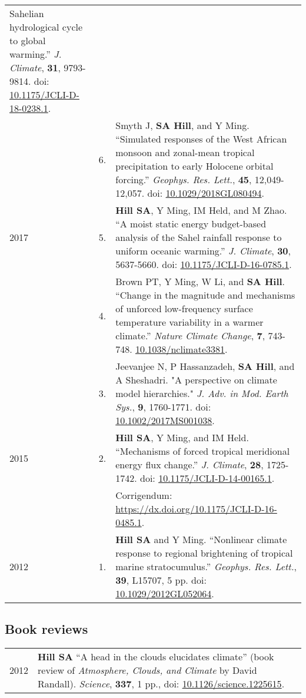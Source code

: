 \documentclass[letterpaper,11pt]{shillcv}
\begin{document}
\begin{longtable}{@{} Y{0.05\textwidth} >{\color{black}} p{0.04\textwidth} @{} L{0.91\textwidth} @{}}
Sahelian hydrological cycle to global warming.''  \emph{J. Climate}, \textbf{31}, 9793-9814.  doi: \href{https://doi.org/10.1175/JCLI-D-18-0238.1}{10.1175/JCLI-D-18-0238.1}.\\
     & 6. & Smyth J, \textbf{SA Hill}, and Y Ming.  ``Simulated responses of
the West African monsoon and zonal-mean tropical precipitation to early
Holocene orbital forcing.''  \emph{Geophys. Res. Lett.}, \textbf{45},
12,049-12,057.  doi: \href{https://doi.org/10.1029/2018GL080494}{10.1029/2018GL080494}.\\
2017 & 5. & \textbf{Hill SA}, Y Ming, IM Held, and M Zhao.  ``A moist
static energy budget-based analysis of the Sahel rainfall response to uniform
oceanic warming.''  \emph{J. Climate}, \textbf{30}, 5637-5660.  doi: \href{https://doi.org/10.1175/JCLI-D-16-0785.1}{10.1175/JCLI-D-16-0785.1}.\\
     & 4. & Brown PT, Y Ming, W Li, and \textbf{SA Hill}.  ``Change
in the magnitude and mechanisms of unforced low-frequency surface temperature
variability in a warmer climate.''  \emph{Nature Climate Change}, \textbf{7}, 743-748.  \href{https://doi.org/10.1038/nclimate3381}{10.1038/nclimate3381}.\\
     & 3. & Jeevanjee N, P Hassanzadeh, \textbf{SA Hill}, and A Sheshadri.  "A perspective on climate model hierarchies."  \emph{J.  Adv. in Mod. Earth Sys.}, \textbf{9}, 1760-1771.  doi: \href{https://doi.org/10.1002/2017MS001038}{10.1002/2017MS001038}.\\
2015 & 2. & \textbf{Hill SA}, Y Ming, and IM Held.  ``Mechanisms of forced
tropical meridional energy flux change.''  \emph{J. Climate}, \textbf{28}, 1725-1742.  doi: \href{http://dx.doi.org/10.1175/JCLI-D-14-00165.1}{10.1175/JCLI-D-14-00165.1}.\\
& & \hspace{1cm} Corrigendum: \href{https://dx.doi.org/10.1175/JCLI-D-16-0485.1}{https://dx.doi.org/10.1175/JCLI-D-16-0485.1}.\\
2012 & 1. & \textbf{Hill SA} and Y Ming.  ``Nonlinear climate response to regional
brightening of tropical marine stratocumulus.''  \emph{Geophys. Res. Lett.},
\textbf{39}, L15707, 5 pp.  doi: \href{http://dx.doi.org/10.1029/2012GL052064}{10.1029/2012GL052064}.\\
\end{longtable}

\subsection*{Book reviews}
\begin{longtable}{@{}  Y{0.05\textwidth} L{0.95\textwidth} @{}}
2012 & \textbf{Hill SA}  ``A head in the clouds elucidates climate'' (book
review of \emph{Atmosphere, Clouds, and Climate} by David Randall).  \emph{Science}, \textbf{337},
1 pp., doi: \href{http://dx.doi.org/10.1126/science.1225615}{10.1126/science.1225615}.\\
\end{longtable}
\end{document}
